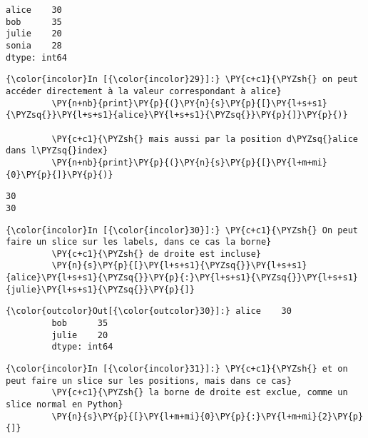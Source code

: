     \begin{Verbatim}[commandchars=\\\{\},frame=single,framerule=0.3mm,rulecolor=\color{cellframecolor}]
alice    30
bob      35
julie    20
sonia    28
dtype: int64
\end{Verbatim}

    \begin{Verbatim}[commandchars=\\\{\},frame=single,framerule=0.3mm,rulecolor=\color{cellframecolor}]
{\color{incolor}In [{\color{incolor}29}]:} \PY{c+c1}{\PYZsh{} on peut accéder directement à la valeur correspondant à alice}
         \PY{n+nb}{print}\PY{p}{(}\PY{n}{s}\PY{p}{[}\PY{l+s+s1}{\PYZsq{}}\PY{l+s+s1}{alice}\PY{l+s+s1}{\PYZsq{}}\PY{p}{]}\PY{p}{)}
         
         \PY{c+c1}{\PYZsh{} mais aussi par la position d\PYZsq{}alice dans l\PYZsq{}index}
         \PY{n+nb}{print}\PY{p}{(}\PY{n}{s}\PY{p}{[}\PY{l+m+mi}{0}\PY{p}{]}\PY{p}{)}
\end{Verbatim}


    \begin{Verbatim}[commandchars=\\\{\},frame=single,framerule=0.3mm,rulecolor=\color{cellframecolor}]
30
30
\end{Verbatim}

    \begin{Verbatim}[commandchars=\\\{\},frame=single,framerule=0.3mm,rulecolor=\color{cellframecolor}]
{\color{incolor}In [{\color{incolor}30}]:} \PY{c+c1}{\PYZsh{} On peut faire un slice sur les labels, dans ce cas la borne}
         \PY{c+c1}{\PYZsh{} de droite est incluse}
         \PY{n}{s}\PY{p}{[}\PY{l+s+s1}{\PYZsq{}}\PY{l+s+s1}{alice}\PY{l+s+s1}{\PYZsq{}}\PY{p}{:}\PY{l+s+s1}{\PYZsq{}}\PY{l+s+s1}{julie}\PY{l+s+s1}{\PYZsq{}}\PY{p}{]}
\end{Verbatim}


\begin{Verbatim}[commandchars=\\\{\},frame=single,framerule=0.3mm,rulecolor=\color{cellframecolor}]
{\color{outcolor}Out[{\color{outcolor}30}]:} alice    30
         bob      35
         julie    20
         dtype: int64
\end{Verbatim}
            
    \begin{Verbatim}[commandchars=\\\{\},frame=single,framerule=0.3mm,rulecolor=\color{cellframecolor}]
{\color{incolor}In [{\color{incolor}31}]:} \PY{c+c1}{\PYZsh{} et on peut faire un slice sur les positions, mais dans ce cas}
         \PY{c+c1}{\PYZsh{} la borne de droite est exclue, comme un slice normal en Python}
         \PY{n}{s}\PY{p}{[}\PY{l+m+mi}{0}\PY{p}{:}\PY{l+m+mi}{2}\PY{p}{]}
\end{Verbatim}


